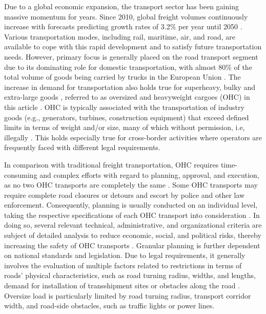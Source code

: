 
Due to a global economic expansion, the transport sector has been gaining massive momentum for years.
Since 2010, global freight volumes continuously increase with forecasts predicting growth rates of 3.2\% per year until 2050 \cite{figura2020preferences, InternationalTransportForum}.
Various transportation modes, including rail, maritime, air, and road, are available to cope with this rapid development and to satisfy future transportation needs.
However, primary focus is generally placed on the road transport segment due to its dominating role for domestic transportation, with almost 80\% of the total volume of goods being carried by trucks in the European Union \cite{Eurostat}.
The increase in demand for transportation also holds true for superheavy, bulky and extra-large goods \cite{gavrilova2021analysis}, referred to as oversized and heavyweight cargoes (OHC) in this article \cite{Luo.2021}.
OHC is typically associated with the transportation of industry goods (e.g., generators, turbines, construction equipment) that exceed defined limits in terms of weight and/or size, many of which without permission, i.e, illegally \cite{fiorillo2016minimizing}. This holds especially true for cross-border activities where operators are frequently faced with different legal requirements. 
\par In comparison with traditional freight transportation, OHC requires time-consuming and complex efforts with regard to planning, approval, and execution, as no two OHC transports are completely the same \cite{Wolnowska.2019}.
Some OHC transports may require complete road closures or detours and escort by police and other law enforcement.
Consequently, planning is usually conducted on an individual level, taking the respective specifications of each OHC transport into consideration \cite{Bazaras.2013}.
In doing so, several relevant technical, administrative, and organizational criteria are subject of detailed analysis to reduce economic, social, and political risks, thereby increasing the safety of OHC transports \cite{Palsaitis.2012}.
Granular planning is further dependent on national standards and legislation. Due to legal requirements, it generally involves the evaluation of multiple factors related to restrictions in terms of roads' physical characteristics, such as road turning radius, widths, and lengths, demand for installation of transshipment sites or obstacles along the road \cite{PETRASKA.2018}.
Oversize load is particularly limited by road turning radius, transport corridor width, and road-side obstacles, such as traffic lights or power lines.
